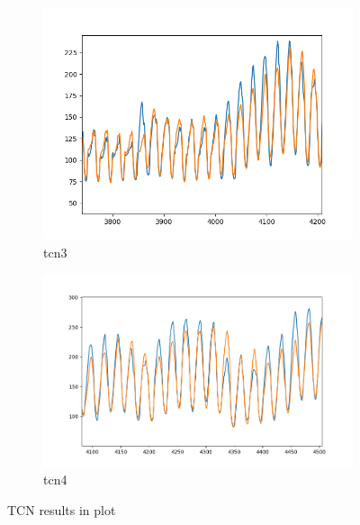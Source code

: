 \begin{figure}
\begin{subfigure}[b]{0.55\textwidth}
        \includegraphics[width=\textwidth]{../Figures/tcn-3.png}
        \caption{tcn3}
        \label{fig:tcn3}
    \end{subfigure}
    \hfill
    \begin{subfigure}[b]{0.55\textwidth}
        \centering
        \includegraphics[width=\textwidth]{../Figures/tcn-4.png}
        \caption{tcn4}
        \label{fig:tcn4}
    \end{subfigure}
       \caption{TCN results in plot}
       \label{fig:tcn}
\end{figure}

